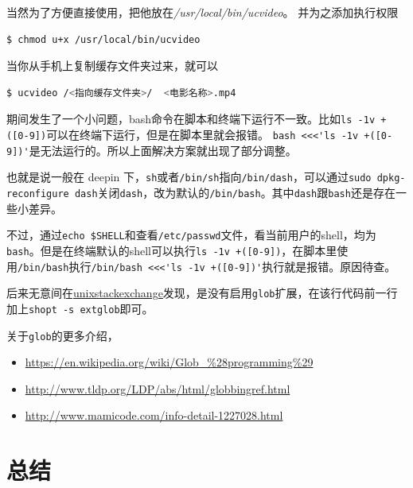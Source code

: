\documentclass[doctor,openright,twoside]{sjtuthesis}
\providecommand{\tightlist}{%
    \setlength{\itemsep}{0pt}\setlength{\parskip}{0pt}}
\newcommand{\passthrough}[1]{#1}
\theoremstyle{plain}
\theoremstyle{definition}
\theoremstyle{remark}
\theoremstyle{ocrenumbox}
\theoremstyle{plain}
\begin{document}
当然为了方便直接使用，把他放在\emph{/usr/local/bin/ucvideo}。
并为之添加执行权限

\begin{lstlisting}[language=bash]
$ chmod u+x /usr/local/bin/ucvideo
\end{lstlisting}

当你从手机上复制缓存文件夹过来，就可以

\begin{lstlisting}[language=bash]
$ ucvideo /<指向缓存文件夹>/  <电影名称>.mp4
\end{lstlisting}

期间发生了一个小问题，bash命令在脚本和终端下运行不一致。比如\passthrough{\lstinline!ls -1v +([0-9])!}可以在终端下运行，但是在脚本里就会报错。
\passthrough{\lstinline!bash <<<'ls -1v +([0-9])'!}是无法运行的。所以上面解决方案就出现了部分调整。

也就是说一般在 deepin
下，\passthrough{\lstinline!sh!}或者\passthrough{\lstinline!/bin/sh!}指向\passthrough{\lstinline!/bin/dash!}，可以通过\passthrough{\lstinline!sudo dpkg-reconfigure dash!}关闭\passthrough{\lstinline!dash!}，改为默认的\passthrough{\lstinline!/bin/bash!}。其中\passthrough{\lstinline!dash!}跟\passthrough{\lstinline!bash!}还是存在一些小差异。

不过，通过\passthrough{\lstinline!echo $SHELL!}和查看\passthrough{\lstinline!/etc/passwd!}文件，看当前用户的shell，均为\passthrough{\lstinline!bash!}。但是在终端默认的shell可以执行\passthrough{\lstinline!ls -1v +([0-9])!}，在脚本里使用\passthrough{\lstinline!/bin/bash!}执行\passthrough{\lstinline!/bin/bash <<<'ls -1v +([0-9])'!}执行就是报错。原因待查。

后来无意间在\href{https://unix.stackexchange.com/questions/471937/how-does-this-work-ls-0-9}{unixstackexchange}发现，是没有启用\passthrough{\lstinline!glob!}扩展，在该行代码前一行加上\passthrough{\lstinline!shopt -s extglob!}即可。

关于\passthrough{\lstinline!glob!}的更多介绍，

\begin{itemize}
\tightlist
\item
  \url{https://en.wikipedia.org/wiki/Glob_\%28programming\%29}
\item
  \url{http://www.tldp.org/LDP/abs/html/globbingref.html}
\item
  \url{http://www.mamicode.com/info-detail-1227028.html}
\end{itemize}

\hypertarget{-7}{%
\section{总结}\label{-7}}
\end{document}
